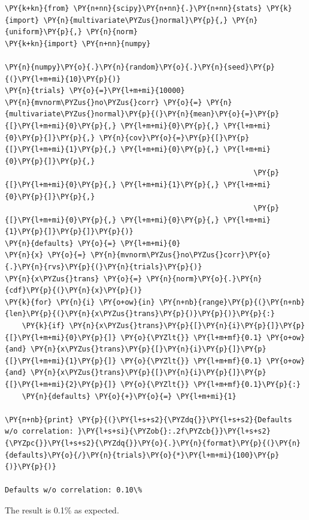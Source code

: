 \begin{codebox}[breakable, size=fbox, boxrule=1pt, pad at break*=1mm,colback=cellbackground, colframe=cellborder]
\begin{Verbatim}[commandchars=\\\{\}]
\PY{k+kn}{from} \PY{n+nn}{scipy}\PY{n+nn}{.}\PY{n+nn}{stats} \PY{k}{import} \PY{n}{multivariate\PYZus{}normal}\PY{p}{,} \PY{n}{uniform}\PY{p}{,} \PY{n}{norm}
\PY{k+kn}{import} \PY{n+nn}{numpy}
	
\PY{n}{numpy}\PY{o}{.}\PY{n}{random}\PY{o}{.}\PY{n}{seed}\PY{p}{(}\PY{l+m+mi}{10}\PY{p}{)}
\PY{n}{trials} \PY{o}{=}\PY{l+m+mi}{10000}
\PY{n}{mvnorm\PYZus{}no\PYZus{}corr} \PY{o}{=} \PY{n}{multivariate\PYZus{}normal}\PY{p}{(}\PY{n}{mean}\PY{o}{=}\PY{p}{[}\PY{l+m+mi}{0}\PY{p}{,} \PY{l+m+mi}{0}\PY{p}{,} \PY{l+m+mi}{0}\PY{p}{]}\PY{p}{,} \PY{n}{cov}\PY{o}{=}\PY{p}{[}\PY{p}{[}\PY{l+m+mi}{1}\PY{p}{,} \PY{l+m+mi}{0}\PY{p}{,} \PY{l+m+mi}{0}\PY{p}{]}\PY{p}{,}
                                                          \PY{p}{[}\PY{l+m+mi}{0}\PY{p}{,} \PY{l+m+mi}{1}\PY{p}{,} \PY{l+m+mi}{0}\PY{p}{]}\PY{p}{,}
                                                          \PY{p}{[}\PY{l+m+mi}{0}\PY{p}{,} \PY{l+m+mi}{0}\PY{p}{,} \PY{l+m+mi}{1}\PY{p}{]}\PY{p}{]}\PY{p}{)}
\PY{n}{defaults} \PY{o}{=} \PY{l+m+mi}{0}
\PY{n}{x} \PY{o}{=} \PY{n}{mvnorm\PYZus{}no\PYZus{}corr}\PY{o}{.}\PY{n}{rvs}\PY{p}{(}\PY{n}{trials}\PY{p}{)}
\PY{n}{x\PYZus{}trans} \PY{o}{=} \PY{n}{norm}\PY{o}{.}\PY{n}{cdf}\PY{p}{(}\PY{n}{x}\PY{p}{)}
\PY{k}{for} \PY{n}{i} \PY{o+ow}{in} \PY{n+nb}{range}\PY{p}{(}\PY{n+nb}{len}\PY{p}{(}\PY{n}{x\PYZus{}trans}\PY{p}{)}\PY{p}{)}\PY{p}{:}
    \PY{k}{if} \PY{n}{x\PYZus{}trans}\PY{p}{[}\PY{n}{i}\PY{p}{]}\PY{p}{[}\PY{l+m+mi}{0}\PY{p}{]} \PY{o}{\PYZlt{}} \PY{l+m+mf}{0.1} \PY{o+ow}{and} \PY{n}{x\PYZus{}trans}\PY{p}{[}\PY{n}{i}\PY{p}{]}\PY{p}{[}\PY{l+m+mi}{1}\PY{p}{]} \PY{o}{\PYZlt{}} \PY{l+m+mf}{0.1} \PY{o+ow}{and} \PY{n}{x\PYZus{}trans}\PY{p}{[}\PY{n}{i}\PY{p}{]}\PY{p}{[}\PY{l+m+mi}{2}\PY{p}{]} \PY{o}{\PYZlt{}} \PY{l+m+mf}{0.1}\PY{p}{:}
	\PY{n}{defaults} \PY{o}{+}\PY{o}{=} \PY{l+m+mi}{1}
	
\PY{n+nb}{print} \PY{p}{(}\PY{l+s+s2}{\PYZdq{}}\PY{l+s+s2}{Defaults w/o correlation: }\PY{l+s+si}{\PYZob{}:.2f\PYZcb{}}\PY{l+s+s2}{\PYZpc{}}\PY{l+s+s2}{\PYZdq{}}\PY{o}{.}\PY{n}{format}\PY{p}{(}\PY{n}{defaults}\PY{o}{/}\PY{n}{trials}\PY{o}{*}\PY{l+m+mi}{100}\PY{p}{)}\PY{p}{)}

Defaults w/o correlation: 0.10\%
\end{Verbatim}
\end{codebox}
The result is 0.1\% as expected.

